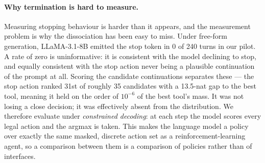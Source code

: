\documentclass[11pt]{article}
\begin{document}
\paragraph{Why termination is hard to measure.}
Measuring stopping behaviour is harder than it appears, and the measurement
problem is why the dissociation has been easy to miss. Under free-form generation,
LLaMA-3.1-8B emitted the stop token in 0 of 240 turns in our pilot. A rate of zero
is uninformative: it is consistent with the model declining to stop, and equally
consistent with the stop action never being a plausible continuation of the prompt
at all. Scoring the candidate continuations separates these --- the stop action
ranked 31st of roughly 35 candidates with a 13.5-nat gap to the best tool, meaning
it held on the order of $10^{-6}$ of the best tool's mass. It was not losing a
close decision; it was effectively absent from the distribution. We therefore evaluate under
\emph{constrained decoding}: at each step the model scores every legal action and
the arg\-max is taken. This makes the language model a policy over exactly the
same masked, discrete action set as a reinforcement-learning agent, so a
comparison between them is a comparison of policies rather than of interfaces.
\end{document}
